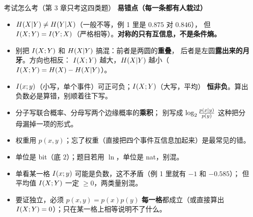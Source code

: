 \begin{exam}{考试怎么考（第 3 章只考这四类题）}
\medskip
\noindent\textbf{易错点（每一条都有人栽过）}
\begin{itemize}[leftmargin=1.6em,itemsep=1pt,topsep=1pt]
  \item $H\!\left(X|Y\right)\ne H\!\left(Y|X\right)$（一般不等，例 1 里是 $0.875$ 对 $0.846$），
        但 $I\!\left(X;Y\right)=I\!\left(Y;X\right)$（严格相等）。\textbf{对称的只有互信息，不是条件熵。}
  \item 别把 $I\!\left(X;Y\right)$ 和 $H\!\left(X|Y\right)$ 搞混：前者是两圆的\textbf{重叠}，
        后者是左圆\textbf{露出来的月牙}。方向也相反：
        $I\!\left(X;Y\right)$ 越大，$H\!\left(X|Y\right)$ 越小（$I\!\left(X;Y\right)=H\!\left(X\right)-H\!\left(X|Y\right)$）。
  \item $I\!\left(x;y\right)$（小写，单个事件）可正可负；$I\!\left(X;Y\right)$（大写，平均）
        \textbf{恒非负}。算出负数必是算错，别顺着往下写。
  \item 分子写联合概率、分母写两个边缘概率的\textbf{乘积}；
        别写成 $\log_{2}\frac{p(x|y)}{p(y)}$ 这种把分母漏掉一项的形式。
  \item 权重用 $p(x,y)$；忘了权重（直接把四个事件互信息加起来）是最常见的错。
  \item 单位是 bit（底 $2$）；题目若用 $\ln$，单位是 nat，别混。
  \item 单看某一格 $I\!\left(x;y\right)$ 可能是负数，这不矛盾（例 1 里就有 $-1$ 和 $-0.585$）；
        但平均值 $I\!\left(X;Y\right)$ 一定 $\ge0$，两类量别混。
  \item 要证独立，必须 $p(x,y)=p(x)p(y)$ \textbf{每一格}都成立（或直接算出
        $I\!\left(X;Y\right)=0$）；只在某一格上相等说明不了什么。
\end{itemize}
\end{exam}

